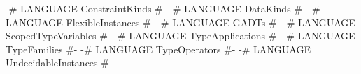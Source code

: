 \begin{code}
{-# LANGUAGE ConstraintKinds      #-}
{-# LANGUAGE DataKinds            #-}
{-# LANGUAGE FlexibleInstances    #-}
{-# LANGUAGE GADTs                #-}
{-# LANGUAGE ScopedTypeVariables  #-}
{-# LANGUAGE TypeApplications     #-}
{-# LANGUAGE TypeFamilies         #-}
{-# LANGUAGE TypeOperators        #-}
{-# LANGUAGE UndecidableInstances #-}
\end{code}
